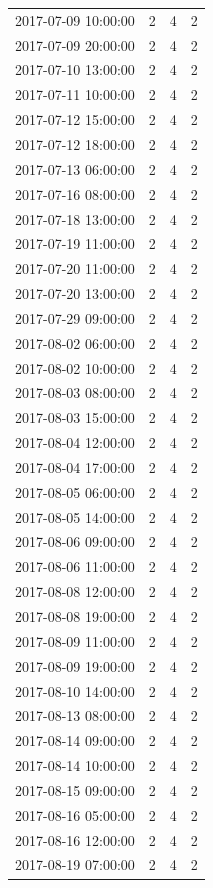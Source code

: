 \begin{tabular}{lrrr}
2017-07-09 10:00:00 & 2 & 4 & 2 \\
2017-07-09 20:00:00 & 2 & 4 & 2 \\
2017-07-10 13:00:00 & 2 & 4 & 2 \\
2017-07-11 10:00:00 & 2 & 4 & 2 \\
2017-07-12 15:00:00 & 2 & 4 & 2 \\
2017-07-12 18:00:00 & 2 & 4 & 2 \\
2017-07-13 06:00:00 & 2 & 4 & 2 \\
2017-07-16 08:00:00 & 2 & 4 & 2 \\
2017-07-18 13:00:00 & 2 & 4 & 2 \\
2017-07-19 11:00:00 & 2 & 4 & 2 \\
2017-07-20 11:00:00 & 2 & 4 & 2 \\
2017-07-20 13:00:00 & 2 & 4 & 2 \\
2017-07-29 09:00:00 & 2 & 4 & 2 \\
2017-08-02 06:00:00 & 2 & 4 & 2 \\
2017-08-02 10:00:00 & 2 & 4 & 2 \\
2017-08-03 08:00:00 & 2 & 4 & 2 \\
2017-08-03 15:00:00 & 2 & 4 & 2 \\
2017-08-04 12:00:00 & 2 & 4 & 2 \\
2017-08-04 17:00:00 & 2 & 4 & 2 \\
2017-08-05 06:00:00 & 2 & 4 & 2 \\
2017-08-05 14:00:00 & 2 & 4 & 2 \\
2017-08-06 09:00:00 & 2 & 4 & 2 \\
2017-08-06 11:00:00 & 2 & 4 & 2 \\
2017-08-08 12:00:00 & 2 & 4 & 2 \\
2017-08-08 19:00:00 & 2 & 4 & 2 \\
2017-08-09 11:00:00 & 2 & 4 & 2 \\
2017-08-09 19:00:00 & 2 & 4 & 2 \\
2017-08-10 14:00:00 & 2 & 4 & 2 \\
2017-08-13 08:00:00 & 2 & 4 & 2 \\
2017-08-14 09:00:00 & 2 & 4 & 2 \\
2017-08-14 10:00:00 & 2 & 4 & 2 \\
2017-08-15 09:00:00 & 2 & 4 & 2 \\
2017-08-16 05:00:00 & 2 & 4 & 2 \\
2017-08-16 12:00:00 & 2 & 4 & 2 \\
2017-08-19 07:00:00 & 2 & 4 & 2 \\

\end{tabular}
